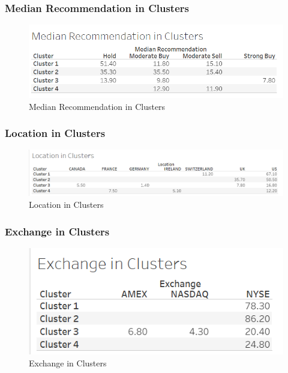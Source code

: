\documentclass[11pt]{article}
\begin{document}
\subsubsection{Median Recommendation in Clusters}
\begin{figure}[H]
    \centering
    \includegraphics[width=0.90\columnwidth]{pics/mr.png}
    \caption{Median Recommendation in Clusters}
    \label{lr}
\end{figure}

\subsubsection{Location in Clusters}
\begin{figure}[H]
    \centering
    \includegraphics[width=0.98\columnwidth]{pics/loc.png}
    \caption{Location in Clusters}
    \label{lr}
\end{figure}

\subsubsection{Exchange in Clusters}
\begin{figure}[H]
    \centering
    \includegraphics[width=0.90\columnwidth]{pics/exch.png}
    \caption{Exchange in Clusters}
    \label{lr}
\end{figure}
\end{document}
